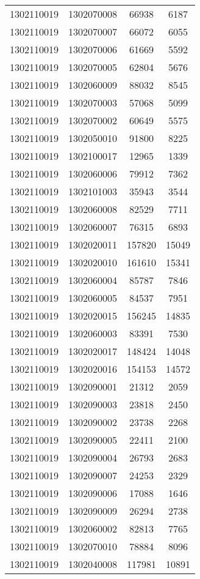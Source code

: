\begin{longtable}{llcc}
1302110019 & 1302070008 & 66938 & 6187\\
1302110019 & 1302070007 & 66072 & 6055\\
1302110019 & 1302070006 & 61669 & 5592\\
1302110019 & 1302070005 & 62804 & 5676\\
1302110019 & 1302060009 & 88032 & 8545\\
1302110019 & 1302070003 & 57068 & 5099\\
1302110019 & 1302070002 & 60649 & 5575\\
1302110019 & 1302050010 & 91800 & 8225\\
1302110019 & 1302100017 & 12965 & 1339\\
1302110019 & 1302060006 & 79912 & 7362\\
1302110019 & 1302101003 & 35943 & 3544\\
1302110019 & 1302060008 & 82529 & 7711\\
1302110019 & 1302060007 & 76315 & 6893\\
1302110019 & 1302020011 & 157820 & 15049\\
1302110019 & 1302020010 & 161610 & 15341\\
1302110019 & 1302060004 & 85787 & 7846\\
1302110019 & 1302060005 & 84537 & 7951\\
1302110019 & 1302020015 & 156245 & 14835\\
1302110019 & 1302060003 & 83391 & 7530\\
1302110019 & 1302020017 & 148424 & 14048\\
1302110019 & 1302020016 & 154153 & 14572\\
1302110019 & 1302090001 & 21312 & 2059\\
1302110019 & 1302090003 & 23818 & 2450\\
1302110019 & 1302090002 & 23738 & 2268\\
1302110019 & 1302090005 & 22411 & 2100\\
1302110019 & 1302090004 & 26793 & 2683\\
1302110019 & 1302090007 & 24253 & 2329\\
1302110019 & 1302090006 & 17088 & 1646\\
1302110019 & 1302090009 & 26294 & 2738\\
1302110019 & 1302060002 & 82813 & 7765\\
1302110019 & 1302070010 & 78884 & 8096\\
1302110019 & 1302040008 & 117981 & 10891\\

\end{longtable}
